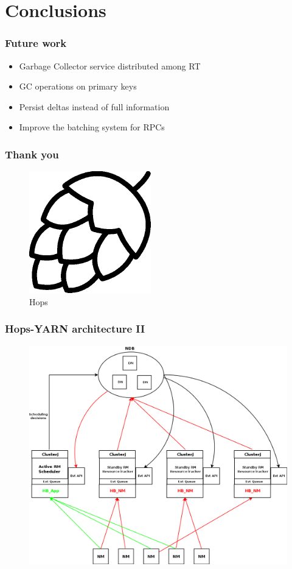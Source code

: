 \documentclass{beamer}
\begin{document}
\section{Conclusions}
\begin{frame}
\frametitle{Future work}

\begin{itemize}
\item Garbage Collector service distributed among RT
\item GC operations on primary keys
\item Persist deltas instead of full information
\item Improve the batching system for RPCs
\end{itemize}
\end{frame}

\begin{frame}
\frametitle{Thank you}

\begin{figure}
\centering
\includegraphics[scale=0.2]{resources/hops_logo.png}
\caption*{Hops}
\end{figure}

\end{frame}

\appendix
\begin{frame}
\frametitle{Hops-YARN architecture II}

\begin{figure}
\centering
\includegraphics[scale=0.21]{resources/hopsyarn_arch_components.png}
\end{figure}
\end{frame}
\end{document}
